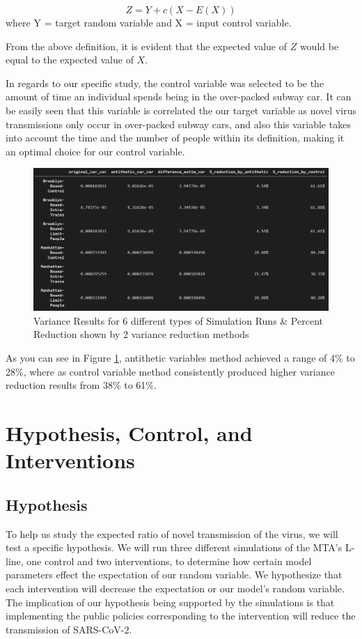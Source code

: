 \documentclass[12pt]{article}
\begin{document}
$$ Z = Y + c(X - E(X)) $$
where Y = target random variable and X = input control variable.

From the above definition, it is evident that the expected value of $Z$ would be equal to the expected value of $X$.

In regards to our specific study, the control variable was selected to be the amount of time an individual spends being in the over-packed subway car. It can be easily seen that this variable is correlated the our target variable as novel virus transmissions only occur in over-packed subway cars, and also this variable takes into account the time and the number of people within its definition, making it an optimal choice for our control variable.

\begin{figure}[h]
	\centering
	\includegraphics[scale=.51]{./figures/var-red-results.png}
	\caption{Variance Results for 6 different types of Simulation Runs \& Percent Reduction shown by 2 variance reduction methods}
	\label{var-red-results}
\end{figure}

As you can see in Figure \ref{var-red-results}, antithetic variables method achieved a range of 4\% to 28\%, where as control variable method consistently produced higher variance reduction results from 38\% to 61\%.

\section{Hypothesis, Control, and Interventions}

\subsection{Hypothesis}

To help us study the expected ratio of novel transmission of the virus, we will test a specific hypothesis.
We will run three different simulations of the MTA's L-line, one control and two interventions, to determine how certain model parameters effect the expectation of our random variable.
We hypothesize that each intervention will decrease the expectation or our model's random variable.
The implication of our hypothesis being supported by the simulations is that implementing the public policies corresponding to the intervention will reduce the transmission of SARS-CoV-2.
\end{document}
